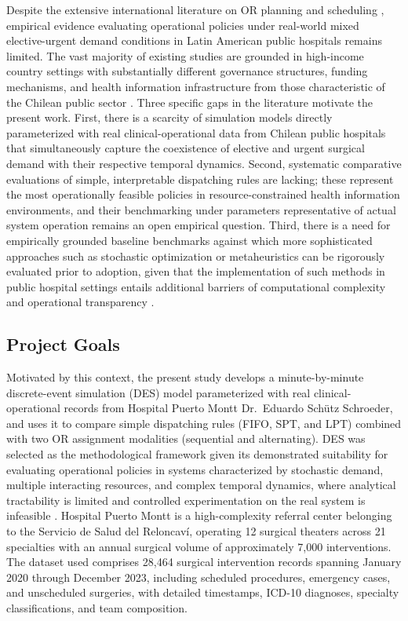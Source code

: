 \documentclass[sn-mathphys-num]{sn-jnl}
\begin{document}
Despite the extensive international literature on OR planning and scheduling
\cite{avendano2025chile,guerriero2011operational,hulshof2012taxonomic}, empirical evidence evaluating
operational policies under real-world mixed elective-urgent demand conditions
in Latin American public hospitals remains limited. The vast majority of
existing studies are grounded in high-income country settings with
substantially different governance structures, funding mechanisms, and health
information infrastructure from those characteristic of the Chilean public
sector \cite{zhu2019operating}. Three specific gaps in the literature motivate the
present work. First, there is a scarcity of simulation models directly
parameterized with real clinical-operational data from Chilean public hospitals
that simultaneously capture the coexistence of elective and urgent surgical
demand with their respective temporal dynamics. Second, systematic comparative
evaluations of simple, interpretable dispatching rules are lacking; these
represent the most operationally feasible policies in resource-constrained
health information environments, and their benchmarking under parameters
representative of actual system operation remains an open empirical question.
Third, there is a need for empirically grounded baseline benchmarks against
which more sophisticated approaches such as stochastic optimization or
metaheuristics can be rigorously evaluated prior to adoption, given that the
implementation of such methods in public hospital settings entails additional
barriers of computational complexity and operational transparency \cite{rios2011just,brailsford2016healthcare}.


\subsection{Project Goals}

Motivated by this context, the present study develops a minute-by-minute
discrete-event simulation (DES) model parameterized with real
clinical-operational records from Hospital Puerto Montt Dr.\ Eduardo Schütz
Schroeder, and uses it to compare simple dispatching rules (FIFO, SPT, and
LPT) combined with two OR assignment modalities (sequential and alternating).
DES was selected as the methodological framework given its demonstrated
suitability for evaluating operational policies in systems characterized by
stochastic demand, multiple interacting resources, and complex temporal
dynamics, where analytical tractability is limited and controlled
experimentation on the real system is infeasible
\cite{gunal2010discrete,jun1999application,vazquez2021discrete}.
Hospital Puerto Montt is a high-complexity referral center belonging to the
Servicio de Salud del Reloncaví, operating 12 surgical theaters across 21
specialties with an annual surgical volume of approximately 7{,}000
interventions. The dataset used comprises 28{,}464 surgical intervention
records spanning January 2020 through December 2023, including scheduled
procedures, emergency cases, and unscheduled surgeries, with detailed
timestamps, ICD-10 diagnoses, specialty classifications, and team composition.
\end{document}
